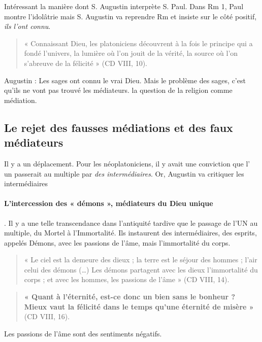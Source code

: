  Intéressant la manière dont S. Augustin interprète S. Paul. Dans Rm 1, Paul montre l'idolâtrie mais S. Augustin va reprendre Rm et insiste sur le côté positif, \textit{ils l'ont connu}.
 
 
  \begin{quote}
     « Connaissant Dieu, les platoniciens découvrent à la fois le principe qui a fondé l’univers, la lumière
où l’on jouit de la vérité, la source où l’on s’abreuve de la félicité » (CD VIII, 10).
 \end{quote}
 
 
 \begin{Synthesis}
 Augustin : Les sages ont connu le vrai Dieu. Mais le problème des sages, c'est qu'ils ne vont pas trouvé les médiateurs. la question de la religion comme médiation.
 \end{Synthesis}
 
 
 \subsection{Le rejet des fausses médiations et des faux médiateurs}
 
 Il y a un déplacement. Pour les néoplatoniciens, il y avait une conviction que l' un passerait au multiple par \textit{des intermédiaires}. Or, Augustin va critiquer les intermédiaires
 
 \paragraph{L’intercession des « démons », médiateurs du Dieu unique}. Il y a une telle transcendance dans l'antiquité tardive que le passage de l'UN au multiple, du Mortel à l'Immortalité. Ils instaurent des intermédiaires, des esprits, appelés Démons, avec les passions de l'âme, mais l'immortalité du corps.
 
\begin{quote}
    « Le ciel est la demeure des dieux ; la terre est le séjour des hommes ; l’air celui des démons (…) Les
démons partagent avec les dieux l’immortalité du corps ; et avec les hommes, les passions de l’âme »
(CD VIII, 14).
\end{quote}

 \begin{quote}
 \textbf{  « Quant à l’éternité, est-ce donc un bien sans le bonheur ? Mieux vaut la félicité dans le temps qu’une
éternité de misère »} (CD VIII, 16). 
\end{quote}
 Les passions de l'âme sont des sentiments négatifs.
 

